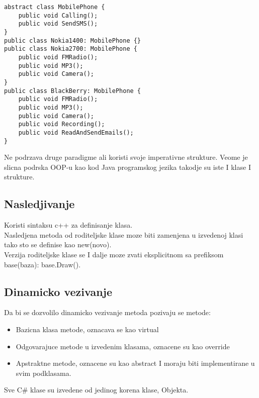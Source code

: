 \documentclass[a4paper]{article}
\begin{document}
\begin{lstlisting}[caption={Primer deklarisanja apstraktivne klase u C\#-u},frame=single, label=lst:csharpDeklaracija]
abstract class MobilePhone {  
    public void Calling();  
    public void SendSMS();  
}  
public class Nokia1400: MobilePhone {}  
public class Nokia2700: MobilePhone {  
    public void FMRadio();  
    public void MP3();  
    public void Camera();  
}  
public class BlackBerry: MobilePhone {  
    public void FMRadio();  
    public void MP3();  
    public void Camera();  
    public void Recording();  
    public void ReadAndSendEmails();  
} 
\end{lstlisting}

Ne podrzava druge paradigme ali koristi svoje imperativne strukture. Veome je slicna podrska OOP-u kao kod Java programskog jezika takodje su iste I klase I strukture.\\

\subsection{Nasledjivanje}
\label{subsec:csharpNasledjivanje}

Koristi sintaksu c++ za definisanje klasa.\\
Nasledjena metoda od roditeljske klase moze biti zamenjena u izvedenoj klasi tako sto se definise kao new(novo).\\
Verzija roditeljske klase se I dalje moze zvati eksplicitnom sa prefiksom base(baza): base.Draw().\\

\subsection{Dinamicko vezivanje}
\label{subsec:csharpDinamickoVezivanje}

Da bi se dozvolilo dinamicko vezivanje metoda pozivaju se metode:\\

\begin{itemize}
  \item Bazicna klasa metode, oznacava se kao virtual
  \item Odgovarajuce metode u izvedenim klasama, oznacene su kao override
  \item Apstraktne metode, oznacene su kao abstract I moraju biti implementirane u svim podklasama.
\end{itemize}

Sve C\# klase su izvedene od jedinog korena klase, Objekta.\\
\end{document}
